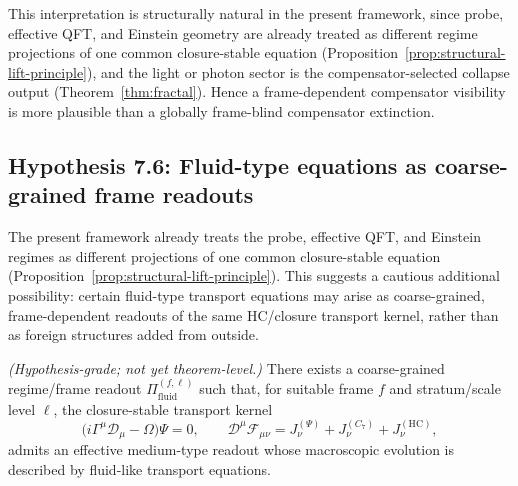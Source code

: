 \begin{remark}
This interpretation is structurally natural in the present framework,
since probe, effective QFT, and Einstein geometry are already treated as
different regime projections of one common closure-stable equation
(Proposition~\ref{prop:structural-lift-principle}), and the light or
photon sector is the compensator-selected collapse output
(Theorem~\ref{thm:fractal}). Hence a frame-dependent compensator
visibility is more plausible than a globally frame-blind compensator
extinction.
\end{remark}

\subsection{Hypothesis 7.6: Fluid-type equations as coarse-grained frame readouts}
\label{subsec:fluid-readout-hypothesis}

The present framework already treats the probe, effective QFT, and
Einstein regimes as different projections of one common closure-stable
equation (Proposition~\ref{prop:structural-lift-principle}). This
suggests a cautious additional possibility: certain fluid-type transport
equations may arise as coarse-grained, frame-dependent readouts of the
same HC/closure transport kernel, rather than as foreign structures added
from outside.

\begin{proposition}
\label{hyp:fluid-readout}
\emph{(Hypothesis-grade; not yet theorem-level.)}
There exists a coarse-grained regime/frame readout
$\Pi_{\mathrm{fluid}}^{(f,\ell)}$
such that, for suitable frame $f$ and stratum/scale level $\ell$, the
closure-stable transport kernel
\[
 \bigl(i\Gamma^\mu\mathcal{D}_\mu - \Omega\bigr)\Psi = 0,
 \qquad
 \mathcal{D}^\mu\mathcal{F}_{\mu\nu}
 = J^{(\Psi)}_\nu + J^{(C_7)}_\nu + J^{(\mathrm{HC})}_\nu,
\]
admits an effective medium-type readout whose macroscopic evolution is
described by fluid-like transport equations.
\end{proposition}

